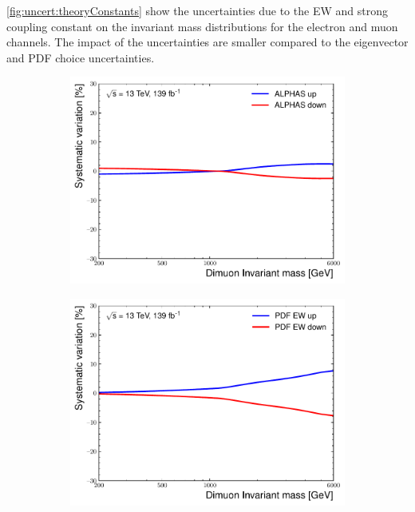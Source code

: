 \cref{fig:uncert:theoryConstants} show the uncertainties due to the EW and strong coupling constant on the invariant mass distributions for the electron and muon channels. The impact of the uncertainties are smaller compared to the eigenvector and PDF choice uncertainties. 
\begin{figure}[h!]
    \centering
    \begin{subfigure}[h]{0.42\textwidth}
        \includegraphics[width=\textwidth]{figures/analysis/datamc/Uncertainties/theory/mm/backgroundTemplate_KF_ALPHAS__1up.pdf}
        \caption{}
        \label{fig:uncert:mmalpha}
    \end{subfigure}
    \begin{subfigure}[h]{0.42\textwidth}
        \centering
        \includegraphics[width=\textwidth]{figures/analysis/datamc/Uncertainties/theory/mm/backgroundTemplate_KF_PDF_EW__1up.pdf}

\end{subfigure}
\end{figure}
